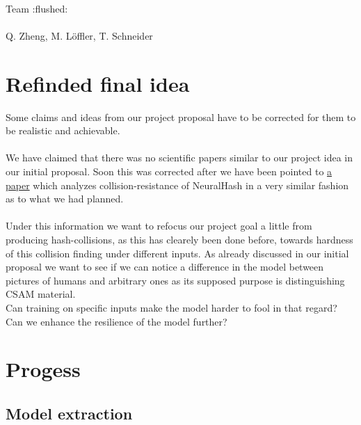 \documentclass[a4paper]{scrartcl}
\begin{document}
\pagestyle{empty}
\begin{center}
\vspace*{30}
\Huge{}
\\ \\ \\
\Large{Team :flushed:}
\\
\vspace*{100}
\Huge{}
\\
\Large{Q. Zheng, M. Löffler, T. Schneider}
\end{center}
\newpage

\section{Refinded final idea}

Some claims and ideas from our project proposal have to be corrected for them to be realistic and achievable. 
\\
\\
We have claimed that there was no scientific papers similar to our project idea in our initial proposal. Soon this was corrected after we have been pointed to \href{https://arxiv.org/pdf/2111.06628.pdf}{a paper} which analyzes collision-resistance of NeuralHash in a very similar fashion as to what we had planned. 
\\
\\
Under this information we want to refocus our project goal a little from producing hash-collisions, as this has clearely been done before, towards hardness of this collision finding under different inputs. As already discussed in our initial proposal we want to see if we can notice a difference in the model between pictures of humans and arbitrary ones as its supposed purpose is distinguishing CSAM material.
\\
Can training on specific inputs make the model harder to fool in that regard? Can we enhance the resilience of the model further? 

\section{Progess}

\subsection{Model extraction}
\end{document}
